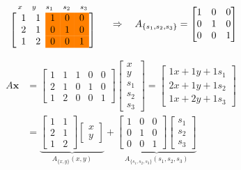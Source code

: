 \[
\begin{array}{c}
\begin{array}{ccccc}
\scriptstyle x & \scriptstyle y & \scriptstyle s_1 & \scriptstyle s_2 & \scriptstyle s_3
\end{array} \\
\left[
\begin{array}{c c >{\columncolor{orange}}c >{\columncolor{orange}}c >{\columncolor{orange}}c}
1 & 1 & 1 & 0 & 0 \\
2 & 1 & 0 & 1 & 0 \\
1 & 2 & 0 & 0 & 1
\end{array}
\right]
\end{array}
\quad
\Rightarrow
\quad
A_{\{s_1, s_2, s_3\}} =
\begin{bmatrix}
1 & 0 & 0 \\
0 & 1 & 0 \\
0 & 0 & 1
\end{bmatrix}
\]

\bigskip

\begin{align*}
A\mathbf{x}
&=
\begin{bmatrix}
1 & 1 & 1 & 0 & 0 \\
2 & 1 & 0 & 1 & 0 \\
1 & 2 & 0 & 0 & 1
\end{bmatrix}
\begin{bmatrix}
x \\ y \\ s_1 \\ s_2 \\ s_3
\end{bmatrix}
=
\begin{bmatrix}
1x + 1y + 1s_1 \\
2x + 1y + 1s_2 \\
1x + 2y + 1s_3
\end{bmatrix} \\
&=
\underbrace{
\begin{bmatrix}
1 & 1 \\
2 & 1 \\
1 & 2
\end{bmatrix}
\begin{bmatrix}
x \\ y
\end{bmatrix}
}_{A_{\{x,y\}} (x, y)}
+
\underbrace{
\begin{bmatrix}
1 & 0 & 0 \\
0 & 1 & 0 \\
0 & 0 & 1
\end{bmatrix}
\begin{bmatrix}
s_1 \\ s_2 \\ s_3
\end{bmatrix}
}_{A_{\{s_1,s_2,s_3\}} (s_1, s_2, s_3)}
\end{align*}

